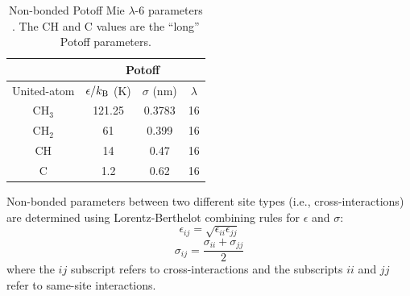 \documentclass[preprint,review,12pt]{elsarticle}
\begin{document}
	\begin{table}[h!]
		\caption{Non-bonded Potoff Mie $\lambda$-6 parameters \cite{Mie,Potoff_branched}. The CH and C values are the ``long'' Potoff parameters.} \label{tab:nonbonded params}
		\begin{center}
			\begin{tabular}{|c|c|c|c|}
				\hline
				\multicolumn{1}{|c}{} & \multicolumn{3}{|c|}{Potoff}  \\ \hline
				United-atom & $\epsilon/k_{\rm B}$ (K) & $\sigma$ (nm) & $\lambda$ \\ \hline
				CH$_3$ & 121.25 & 0.3783 & 16  \\ 
				CH$_2$ & 61 & 0.399 & 16 \\ 
				CH & 14 & 0.47 & 16\\
				C & 1.2 & 0.62 & 16\\
				\hline
			\end{tabular}
		\end{center} 

	\end{table}

\normalsize
	
	Non-bonded parameters between two different site types (i.e., cross-interactions) are determined using Lorentz-Berthelot combining rules \cite{Allen2017} for $\epsilon$ and $\sigma$:
	\begin{equation} \label{eq:Lorentz-Berthelot_eps}
	\epsilon_{ij} = \sqrt{\epsilon_{ii} \epsilon_{jj}}
	\end{equation}
	\begin{equation} \label{eq:Lorentz-Berthelot_sig}
	\sigma_{ij} = \frac{\sigma_{ii} + \sigma_{jj}}{2}
	\end{equation}
	where the $ij$ subscript refers to cross-interactions and the subscripts $ii$ and $jj$ refer to same-site interactions. 
	
\end{document}
